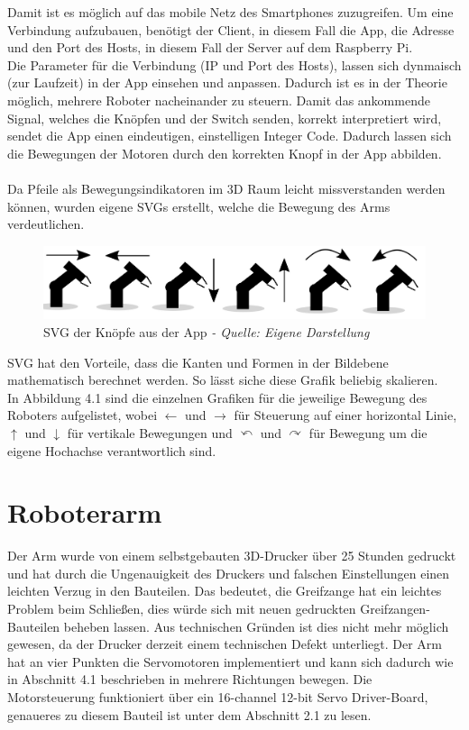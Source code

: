 \documentclass[12pt,					%
							 oneside,			%
							 a4paper,			%
							 halfparskip,		%
							 liststotoc,			%
							 bibtotoc,			%
							 fleqn,				%
							 pointlessnumbers]	%
							 {scrreprt}
\begin{document}
Damit ist es möglich auf das mobile Netz des Smartphones zuzugreifen. Um eine Verbindung aufzubauen, benötigt der Client, in diesem Fall die App, die Adresse und den Port des Hosts, in diesem Fall der Server auf dem Raspberry Pi. \\
Die Parameter für die Verbindung (IP und Port des Hosts), lassen sich dynmaisch (zur Laufzeit) in der App einsehen und anpassen. Dadurch ist es in der Theorie möglich, mehrere Roboter nacheinander zu steuern. 
Damit das ankommende Signal, welches die Knöpfen und der Switch senden, korrekt interpretiert wird, sendet die App einen eindeutigen, einstelligen Integer Code. Dadurch lassen sich die Bewegungen der Motoren durch den korrekten Knopf in der App abbilden. \\ \\
Da Pfeile als Bewegungsindikatoren im 3D Raum leicht missverstanden werden können, wurden eigene SVGs erstellt, welche die Bewegung des Arms verdeutlichen. 
\begin{figure}[h]
	\centering
	\includegraphics[scale=0.3]{pictures/robissvg.jpg}
	\caption{SVG der Knöpfe aus der App \textit{- Quelle: Eigene Darstellung}}
\end{figure}
\newpage
SVG hat den Vorteile, dass die Kanten und Formen in der Bildebene mathematisch berechnet werden. So lässt siche diese Grafik beliebig skalieren. \\
In Abbildung 4.1 sind die einzelnen Grafiken für die jeweilige Bewegung des Roboters aufgelistet, wobei $\leftarrow$ und $\rightarrow$ für Steuerung auf einer horizontal Linie, $\uparrow$ und $\downarrow$ für vertikale Bewegungen und $\curvearrowleft$ und $\curvearrowright$ für Bewegung um die eigene Hochachse verantwortlich sind.

\section{Roboterarm}
Der Arm wurde von einem selbstgebauten 3D-Drucker über 25 Stunden gedruckt und hat durch die Ungenauigkeit des Druckers und falschen Einstellungen einen leichten Verzug in den Bauteilen. Das bedeutet, die Greifzange hat ein leichtes Problem beim Schließen, dies würde sich mit neuen gedruckten Greifzangen-Bauteilen beheben lassen. Aus technischen Gründen ist dies nicht mehr möglich gewesen, da der Drucker derzeit einem technischen Defekt unterliegt.
Der Arm hat an vier Punkten die Servomotoren implementiert und kann sich dadurch wie in Abschnitt 4.1 beschrieben in mehrere Richtungen bewegen. Die Motorsteuerung funktioniert über ein 16-channel 12-bit Servo Driver-Board, genaueres zu diesem Bauteil ist unter dem Abschnitt 2.1 zu lesen.
\newpage
\end{document}
